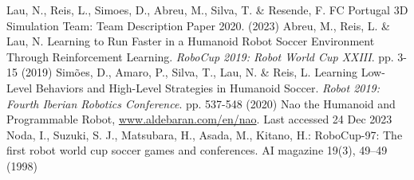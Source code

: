 \documentclass[conference]{IEEEtran}
\begin{document}
\begin{thebibliography}{00}
    Lau, N., Reis, L., Simoes, D., Abreu, M., Silva, T. \& Resende, F. FC Portugal 3D Simulation Team: Team Description Paper 2020.  (2023)
    Abreu, M., Reis, L. \& Lau, N. Learning to Run Faster in a Humanoid Robot Soccer Environment Through Reinforcement Learning. {\em RoboCup 2019: Robot World Cup XXIII}. pp. 3-15 (2019)
    Simões, D., Amaro, P., Silva, T., Lau, N. \& Reis, L. Learning Low-Level Behaviors and High-Level Strategies in Humanoid Soccer. {\em Robot 2019: Fourth Iberian Robotics Conference}. pp. 537-548 (2020)
     Nao the Humanoid and Programmable Robot, \href{www.aldebaran.com/en/nao}{www.aldebaran.com/en/nao}. Last accessed 24 Dec 2023
     Noda, I., Suzuki, S. J., Matsubara, H., Asada, M., Kitano, H.: RoboCup-97: The first robot world cup soccer games and conferences. AI magazine 19(3), 49–49 (1998)
\end{thebibliography}
\end{document}
